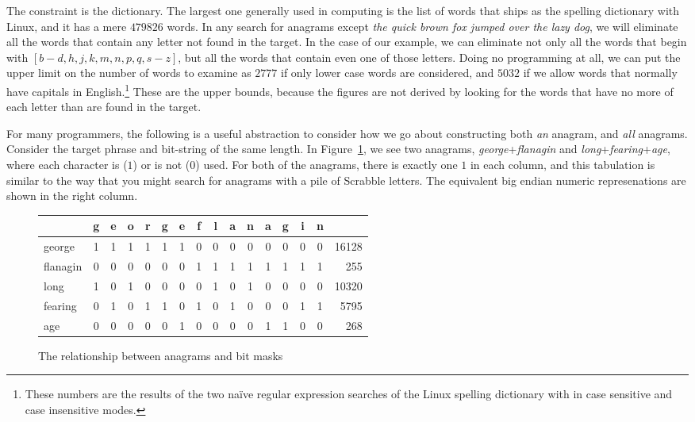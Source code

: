 \documentclass[letterpaper, 11pt]{article}
\begin{document}
The constraint is the dictionary. The largest one generally used
in computing is the list of words that ships as the spelling
dictionary with Linux, and it has a mere $479826$ words. In any
search for anagrams except \emph{the quick brown fox jumped over
the lazy dog}, we will eliminate all the words that contain any
letter not found in the target. In the case of our example, we can
eliminate not only all the words that begin with $[b-d,h,j,k,m,n,p,q,s-z]$,
but all the words that contain even one of those letters. Doing no
programming at all, we can put the upper limit on the number of
words to examine as $2777$ if only lower case words are considered,
and $5032$ if we allow words that normally have capitals in
English.\footnote{These numbers are the results of the two na\"ive
regular expression searches of the Linux spelling dictionary with
\lit{\textasciicircum[aegnfilor]\textbackslash+\$} in case sensitive
and case insensitive modes.} These are the upper bounds, because
the figures are not derived by looking for the words that have no
more of each letter than are found in the target.

For many programmers, the following is a useful abstraction to
consider how we go about constructing both \emph{an} anagram, and
\emph{all} anagrams.  Consider the target phrase and bit-string of
the same length. In Figure~\ref{fig:bitmask}, we see two anagrams,
\emph{george}+\emph{flanagin} and \emph{long}+\emph{fearing}+\emph{age},
where each character is ($1$) or is not ($0$) used. For both of the
anagrams, there is exactly one $1$ in each column, and this tabulation
is similar to the way that you might search for anagrams with a
pile of Scrabble\CircleR\xspace letters. The equivalent big endian
numeric represenations are shown in the right column.

\begin{figure}
\begin{center}
\begin{tabular}{lccccccccccccccr}
\toprule
 &g&e&o&r&g&e&f&l&a&n&a&g&i&n&\\
\midrule
george&1&1&1&1&1&1&0&0&0&0&0&0&0&0&16128\\
flanagin&0&0&0&0&0&0&1&1&1&1&1&1&1&1&255\\
\midrule
long&1&0&1&0&0&0&0&1&0&1&0&0&0&0&10320\\
fearing&0&1&0&1&1&0&1&0&1&0&0&0&1&1&5795\\
age&0&0&0&0&0&1&0&0&0&0&1&1&0&0&268\\
\bottomrule
\end{tabular}
\caption{The relationship between anagrams and bit masks}
\label{fig:bitmask}
\end{center}
\end{figure}
\end{document}
